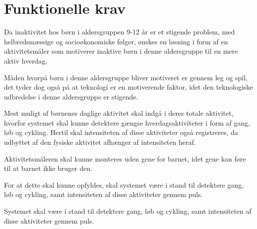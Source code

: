 \section{Funktionelle krav}

%
%
Da inaktivitet hos børn i aldersgruppen 9-12 år er et stigende problem, med helbredsmæssige og socioøkonomiske følger, ønskes en løsning i form af en aktivitetsmåler som motiverer inaktive børn i denne aldersgruppe til en mere aktiv hverdag. 

Måden hvorpå børn i denne aldersgruppe bliver motiveret er gennem leg og spil, det tyder dog også på at teknologi er en motiverende faktor, idet den teknologiske udbredelse i denne aldersgruppe er stigende.

Mest muligt af børnenes daglige aktivitet skal indgå i deres totale aktivitet, hvorfor systemet skal kunne detektere gængse hverdagsaktiviteter i form af gang, løb og cykling. Hertil skal intensiteten af disse aktiviteter også registreres, da udbyttet af den fysiske aktivitet afhænger af intensiteten heraf. 

Aktivitetsmåleren skal kunne monteres uden gene for barnet, idet gene kan føre til at barnet ikke bruger den.



For at dette skal kunne opfyldes, skal systemet være i stand til detektere gang, løb og cykling, samt intensiteten af disse aktiviteter gennem puls. %

Systemet skal være i stand til detektere gang, løb og cykling, samt intensiteten af disse aktiviteter gennem puls.

